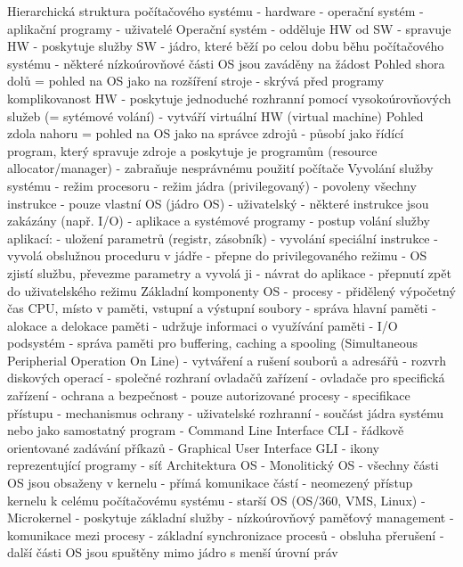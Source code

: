 Hierarchická struktura počítačového systému
- hardware
- operační systém
- aplikační programy
- uživatelé
Operační systém
- odděluje HW od SW
- spravuje HW
- poskytuje služby SW
- jádro, které běží po celou dobu běhu počítačového systému
    - některé nízkoúrovňové části OS jsou zaváděny na žádost
Pohled shora dolů
  = pohled na OS jako na rozšíření stroje
  - skrývá před programy komplikovanost HW
  - poskytuje jednoduché rozhranní pomocí vysokoúrovňových služeb (= sytémové volání)
  - vytváří virtuální HW (virtual machine)
 Pohled zdola nahoru
  = pohled na OS jako na správce zdrojů
  - působí jako řídící program, který spravuje zdroje a poskytuje je programům (resource allocator/manager)
  - zabraňuje nesprávnému použití počítače
 Vyvolání služby systému
  - režim procesoru
      - režim jádra (privilegovaný)
          - povoleny všechny instrukce
          - pouze vlastní OS (jádro OS)
      - uživatelský
          - některé instrukce jsou zakázány (např. I/O)
          - aplikace a systémové programy
  - postup volání služby aplikací:
      - uložení parametrů (registr, zásobník)
      - vyvolání speciální instrukce
          - vyvolá obslužnou proceduru v jádře
          - přepne do privilegovaného režimu
      - OS zjistí službu, převezme parametry a vyvolá ji
      - návrat do aplikace
      - přepnutí zpět do uživatelského režimu
Základní komponenty OS
- procesy - přidělený výpočetný čas CPU, místo v paměti, vstupní a výstupní soubory
- správa hlavní paměti - alokace a delokace paměti
    - udržuje informaci o využívání paměti
- I/O podsystém
    - správa paměti pro buffering, caching a spooling (Simultaneous Peripherial Operation On Line)
    - vytváření a rušení souborů a adresářů
    - rozvrh diskových operací
    - společné rozhraní ovladačů zařízení
    - ovladače pro specifická zařízení
- ochrana a bezpečnost
    - pouze autorizované procesy
    - specifikace přístupu
    - mechanismus ochrany 
- uživatelské rozhranní
    - součást jádra systému nebo jako samostatný program
    - Command Line Interface CLI - řádkově orientované zadávání příkazů
    - Graphical User Interface GLI - ikony reprezentující programy
- síť
Architektura OS
- Monolitický OS
    - všechny části OS jsou obsaženy v kernelu
    - přímá komunikace částí
    - neomezený přístup kernelu k celému počítačovému systému
    - starší OS (OS/360, VMS, Linux)
- Microkernel
    - poskytuje základní služby
        - nízkoúrovňový paměťový management
        - komunikace mezi procesy
        - základní synchronizace procesů
        - obsluha přerušení
    - další části OS jsou spuštěny mimo jádro s menší úrovní práv
